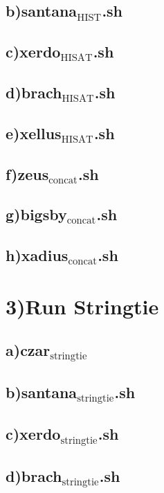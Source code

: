 \documentclass[11pt]{article}
\begin{document}
\subsection{b)santana$_{\text{HIST}}$.sh}
\label{sec-2-2}
\subsection{c)xerdo$_{\text{HISAT}}$.sh}
\label{sec-2-3}
\subsection{d)brach$_{\text{HISAT}}$.sh}
\label{sec-2-4}
\subsection{e)xellus$_{\text{HISAT}}$.sh}
\label{sec-2-5}
\subsection{f)zeus$_{\text{concat}}$.sh}
\label{sec-2-6}
\subsection{g)bigsby$_{\text{concat}}$.sh}
\label{sec-2-7}
\subsection{h)xadius$_{\text{concat}}$.sh}
\label{sec-2-8}
\section{3)Run Stringtie}
\label{sec-3}
\subsection{a)czar$_{\text{stringtie}}$}
\label{sec-3-1}
\subsection{b)santana$_{\text{stringtie}}$.sh}
\label{sec-3-2}
\subsection{c)xerdo$_{\text{stringtie}}$.sh}
\label{sec-3-3}
\subsection{d)brach$_{\text{stringtie}}$.sh}
\label{sec-3-4}
\end{document}
